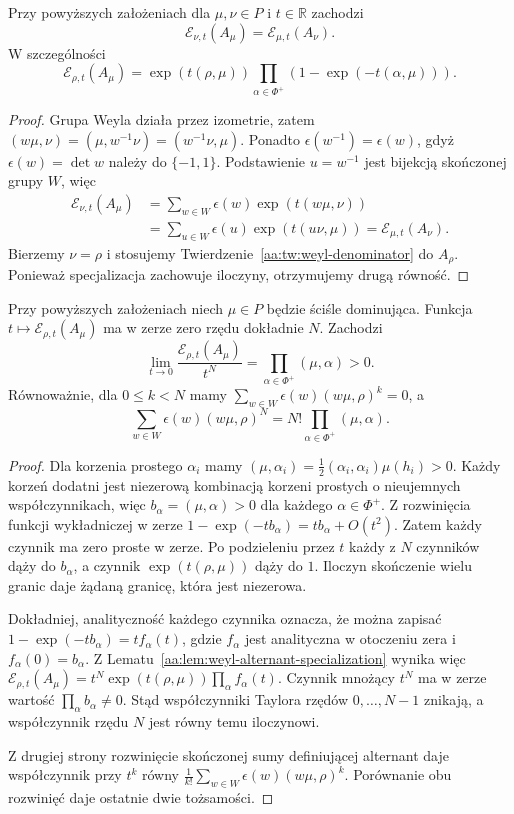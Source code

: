\begin{lemat}
\label{aa:lem:weyl-alternant-specialization}
Przy powyższych założeniach dla $\mu,\nu\in P$ i $t\in\mathbb R$ zachodzi
\[
 \mathcal E_{\nu,t}(A_\mu)=\mathcal E_{\mu,t}(A_\nu).
\]
W szczególności
\[
 \mathcal E_{\rho,t}(A_\mu)=
 \exp(t(\rho,\mu))
 \prod_{\alpha\in\Phi^+}(1-\exp(-t(\alpha,\mu))).
\]
\end{lemat}
\begin{proof}
Grupa Weyla działa przez izometrie, zatem $(w\mu,\nu)=(\mu,w^{-1}\nu)=(w^{-1}\nu,\mu)$. Ponadto $\epsilon(w^{-1})=\epsilon(w)$, gdyż $\epsilon(w)=\det w$ należy do $\{-1,1\}$. Podstawienie $u=w^{-1}$ jest bijekcją skończonej grupy $W$, więc
\[
 \begin{aligned}
 \mathcal E_{\nu,t}(A_\mu)
 &=\sum_{w\in W}\epsilon(w)\exp(t(w\mu,\nu))\\
 &=\sum_{u\in W}\epsilon(u)\exp(t(u\nu,\mu))
 =\mathcal E_{\mu,t}(A_\nu).
 \end{aligned}
\]
Bierzemy $\nu=\rho$ i stosujemy Twierdzenie~\ref{aa:tw:weyl-denominator} do $A_\rho$. Ponieważ specjalizacja zachowuje iloczyny, otrzymujemy drugą równość.
\end{proof}

\begin{lemat}
\label{aa:lem:weyl-alternant-order}
Przy powyższych założeniach niech $\mu\in P$ będzie ściśle dominująca. Funkcja $t\mapsto\mathcal E_{\rho,t}(A_\mu)$ ma w zerze zero rzędu dokładnie $N$. Zachodzi
\[
 \lim_{t\to0}\frac{\mathcal E_{\rho,t}(A_\mu)}{t^N}
 =\prod_{\alpha\in\Phi^+}(\mu,\alpha)>0.
\]
Równoważnie, dla $0\le k<N$ mamy
$\sum_{w\in W}\epsilon(w)(w\mu,\rho)^k=0$, a
\[
 \sum_{w\in W}\epsilon(w)(w\mu,\rho)^N
 =N!\prod_{\alpha\in\Phi^+}(\mu,\alpha).
\]
\end{lemat}
\begin{proof}
Dla korzenia prostego $\alpha_i$ mamy $(\mu,\alpha_i)=\frac12(\alpha_i,\alpha_i)\mu(h_i)>0$. Każdy korzeń dodatni jest niezerową kombinacją korzeni prostych o nieujemnych współczynnikach, więc $b_\alpha=(\mu,\alpha)>0$ dla każdego $\alpha\in\Phi^+$. Z rozwinięcia funkcji wykładniczej w zerze
$1-\exp(-tb_\alpha)=tb_\alpha+O(t^2)$.
Zatem każdy czynnik ma zero proste w zerze. Po podzieleniu przez $t$ każdy z $N$ czynników dąży do $b_\alpha$, a czynnik $\exp(t(\rho,\mu))$ dąży do $1$. Iloczyn skończenie wielu granic daje żądaną granicę, która jest niezerowa.

Dokładniej, analityczność każdego czynnika oznacza, że można zapisać $1-\exp(-tb_\alpha)=t f_\alpha(t)$, gdzie $f_\alpha$ jest analityczna w otoczeniu zera i $f_\alpha(0)=b_\alpha$. Z Lematu~\ref{aa:lem:weyl-alternant-specialization} wynika więc
$\mathcal E_{\rho,t}(A_\mu)=t^N\exp(t(\rho,\mu))\prod_\alpha f_\alpha(t)$.
Czynnik mnożący $t^N$ ma w zerze wartość $\prod_\alpha b_\alpha\ne0$. Stąd współczynniki Taylora rzędów $0,\ldots,N-1$ znikają, a współczynnik rzędu $N$ jest równy temu iloczynowi.

Z drugiej strony rozwinięcie skończonej sumy definiującej alternant daje współczynnik przy $t^k$ równy
$\frac1{k!}\sum_{w\in W}\epsilon(w)(w\mu,\rho)^k$.
Porównanie obu rozwinięć daje ostatnie dwie tożsamości.
\end{proof}

